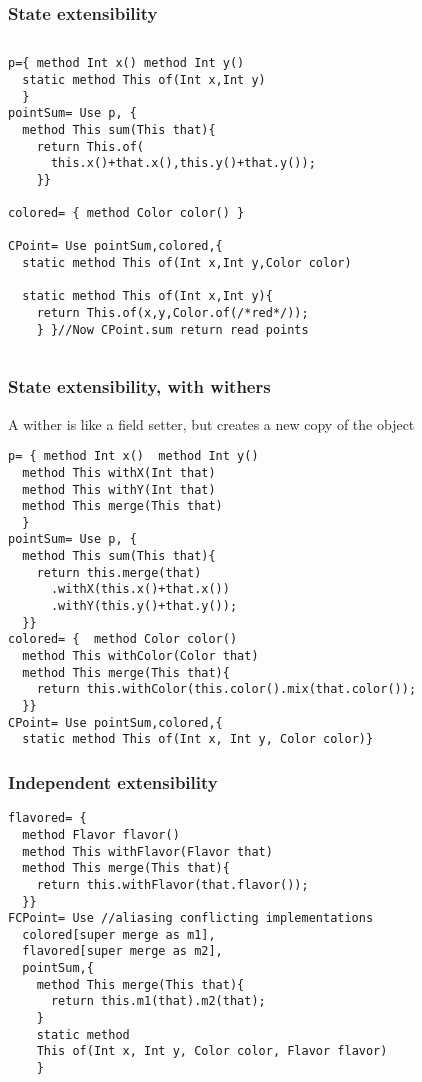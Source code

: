 \begin{frame}[fragile]
\frametitle{State extensibility}
\vspace{-2ex}
\begin{columns}
    \column{\dimexpr\paperwidth-10pt}
\begin{Scaled}{0.9}{0.9}
\begin{lstlisting}
p={ method Int x() method Int y()
  static method This of(Int x,Int y)
  }
pointSum= Use p, {
  method This sum(This that){
    return This.of(
      this.x()+that.x(),this.y()+that.y());
    }}

colored= { method Color color() }

CPoint= Use pointSum,colored,{
  static method This of(Int x,Int y,Color color)
 
  static method This of(Int x,Int y){
    return This.of(x,y,Color.of(/*red*/));
    } }//Now CPoint.sum return read points
\end{lstlisting}
\end{Scaled}
\end{columns}
\end{frame}

\begin{frame}[fragile]
\frametitle{State extensibility, with withers}
\vspace{-1ex}
A wither is like a field setter, but creates a new copy of the object
\vspace{-1ex}
\begin{Scaled}{0.85}{0.85}
 \begin{lstlisting}
p= { method Int x()  method Int y()
  method This withX(Int that)
  method This withY(Int that)
  method This merge(This that)
  }
pointSum= Use p, { 
  method This sum(This that){
    return this.merge(that)
      .withX(this.x()+that.x())
      .withY(this.y()+that.y());
  }}
colored= {  method Color color()
  method This withColor(Color that)
  method This merge(This that){
    return this.withColor(this.color().mix(that.color());
  }}
CPoint= Use pointSum,colored,{
  static method This of(Int x, Int y, Color color)}
\end{lstlisting}  
\end{Scaled}
\end{frame}





\begin{frame}[fragile]
\frametitle{Independent extensibility}
\begin{Scaled}{0.85}{0.85}
 \begin{lstlisting}
flavored= {
  method Flavor flavor()
  method This withFlavor(Flavor that)
  method This merge(This that){
    return this.withFlavor(that.flavor());
  }}
FCPoint= Use //aliasing conflicting implementations
  colored[super merge as m1],
  flavored[super merge as m2],
  pointSum,{
    method This merge(This that){
      return this.m1(that).m2(that);
    }
    static method 
    This of(Int x, Int y, Color color, Flavor flavor)
    }
\end{lstlisting} 
\end{Scaled}
\end{frame}

